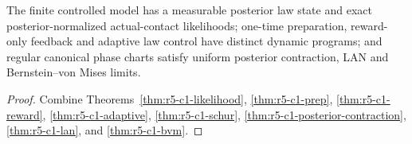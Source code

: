 \begin{theorem}
\label{thm:r5-c1-main}
The finite controlled model has a measurable posterior law state and exact
posterior-normalized actual-contact likelihoods; one-time preparation,
reward-only feedback and adaptive law control have distinct dynamic programs;
and regular canonical phase charts satisfy uniform posterior contraction,
LAN and Bernstein--von Mises limits.
\end{theorem}

\begin{proof}
Combine Theorems~\ref{thm:r5-c1-likelihood},
\ref{thm:r5-c1-prep}, \ref{thm:r5-c1-reward},
\ref{thm:r5-c1-adaptive}, \ref{thm:r5-c1-schur},
\ref{thm:r5-c1-posterior-contraction},
\ref{thm:r5-c1-lan}, and \ref{thm:r5-c1-bvm}.
\end{proof}
